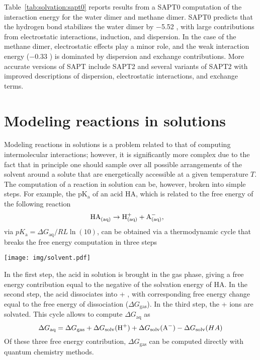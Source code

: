 \documentclass[../Main/notes.tex]{subfiles}
\begin{document}
Table~\ref{tab:solvation:sapt0} reports results from a SAPT0 computation of the interaction energy for the water dimer and methane dimer.
SAPT0 predicts that the hydrogen bond stabilizes the water dimer by $-$5.52 \kcal, with large contributions from electrostatic interactions, induction, and dispersion.
In the case of the methane dimer, electrostatic effects play a minor role, and the weak interaction energy ($-$0.33 \kcal) is dominated by dispersion and exchange contributions.
More accurate versions of SAPT include SAPT2 and several variants of SAPT2 with improved descriptions of dispersion, electrostatic interactions, and exchange terms.

\section{Modeling reactions in solutions}


Modeling reactions in solutions is a problem related to that of computing intermolecular interactions; however, it is significantly more complex due to the fact that in principle one should sample over all possible arrangements of the solvent around a solute that are energetically accessible at a given temperature $T$.
The computation of a reaction in solution can be, however, broken into simple steps.
For example, the pK$_\mathrm{a}$ of an acid HA, which is related to the free energy of the following reaction 
\begin{equation}
\ce{HA_{(aq)}} \rightarrow \ce{H^+_{(aq)}} + \ce{A^-_{(aq)}}, \quad 
\end{equation}
via $pK_\mathrm{a} = \Delta G_\textrm{aq} / RL \ln(10)$, can be obtained via a thermodynamic cycle  that breaks the free energy computation in three steps
\begin{center}
\texttt{[image: img/solvent.pdf]}
\end{center}
In the first step, the acid in solution is brought in the gas phase, giving a free energy contribution equal to the negative of the solvation energy of HA.
In the second step, the acid dissociates into  + , with corresponding free energy change equal to the free energy of dissociation ($\Delta G_\textrm{gas}$).
In the third step, the  +  ions are solvated.
This cycle allows to compute $\Delta G_\textrm{aq}$ as
\begin{equation}
\Delta G_\textrm{aq} = \Delta G_\textrm{gas} + \Delta G_\textrm{solv}(\ce{H^+}) + \Delta G_\textrm{solv}(\ce{A^-})  -\Delta G_\textrm{solv}(HA)
\end{equation}
Of these three free energy contribution, $\Delta G_\textrm{gas}$ can be computed directly with quantum chemistry methods.
\end{document}
